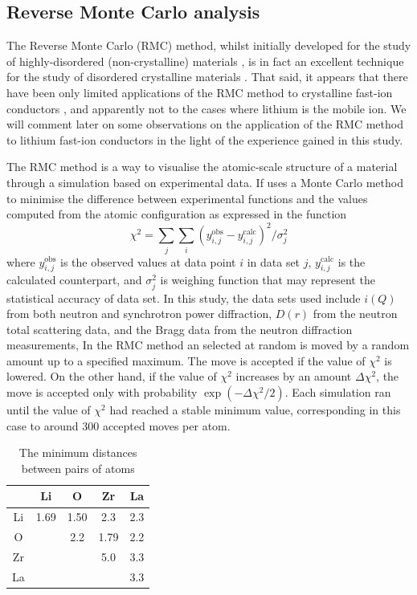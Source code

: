 \documentclass[twoside,twocolumn,9pt]{article}
\begin{document}


\subsection{Reverse Monte Carlo analysis}

The Reverse Monte Carlo (RMC) method, whilst initially developed for the study of highly-disordered (non-crystalline) materials \cite{McGreevy:1988bu},
is in fact an excellent technique for the study of disordered crystalline materials \cite{Keen:2005dd}.
That said, it appears that there have been only limited applications of the RMC method to crystalline fast-ion conductors \cite{Adams:2000ez, Swenson:2001if, Adams:2002ga,Adams:2005ds},
and apparently not to the cases where lithium is the mobile ion. We will comment later on some observations on the application of the RMC method to lithium fast-ion conductors
in the light of the experience gained in this study.

The RMC method is a way to visualise the atomic-scale structure of a material through a simulation based on experimental data. If uses a Monte Carlo method to minimise the difference between experimental functions and the values computed from the atomic configuration as expressed in the function
\begin{equation}
\chi^2=\sum_{j}\sum_{i}(y^ \mathrm{obs}_{i,j}-y^ \mathrm{calc}_{i,j})^2/\sigma^2_{j}
\end{equation}
where $y^\mathrm{obs}_{i,j}$ is the observed values at data point $i$ in data set $j$, $y^ \mathrm{calc}_{i,j}$ is the calculated counterpart, and  $\sigma^2_{j}$ is weighing function that may represent the statistical accuracy of data set. In this study, the data sets used include $i(Q)$ from both neutron and  synchrotron power diffraction, $D(r)$ from the neutron total scattering data, and the Bragg data from the neutron diffraction measurements, In the RMC method an selected at random is moved by a random amount up to a specified maximum. The move is accepted if the value of $\chi^2$ is lowered. On the other hand, if the value of $\chi^2$ increases by an amount $\Delta \chi^2$, the move is accepted only with probability $\exp(-\Delta \chi^2/2)$. Each simulation ran until the value of $\chi^2$ had reached a stable minimum value, corresponding in this case to around 300 accepted moves per atom.

\begin{table}[t]
\centering
\caption{The minimum distances between pairs of atoms} \label{tab:min_dis}
\begin{tabular}{c|cccc}
\hline
   & Li & O & Zr & La \\
\hline
Li & 1.69 & 1.50 & 2.3 & 2.3 \\
O  &      & 2.2  & 1.79& 2.2 \\
Zr &      &      & 5.0 & 3.3 \\
La &      &      &     & 3.3 \\
\hline
\end{tabular}
\end{table}
\end{document}
